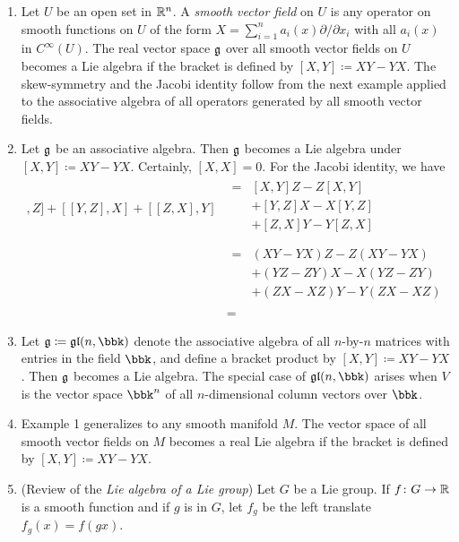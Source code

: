 \begin{examples}
  \begin{enumerate}[label=(\arabic*)]
  \item Let $U$ be an open set in $\mathbb{R}^n$. A \emph{smooth vector field} on
    $U$ is any operator on smooth functions on $U$ of the form
    $X=\sum_{i=1}^na_i(x)\partial/\partial x_i$ with all $a_i(x)$ in
    $C^\infty(U)$. The real vector space $\mathfrak{g}$ over all smooth vector
    fields on $U$ becomes a Lie algebra if the bracket is defined by
    $[X,Y]\coloneq XY-YX$. The skew-symmetry and the Jacobi identity follow
    from the next example applied to the associative algebra of all
    operators generated by all smooth vector fields.
  \item Let $\mathfrak{g}$ be an associative algebra. Then $\mathfrak{g}$ becomes a Lie
    algebra under $[X,Y]\coloneq XY-YX$. Certainly, $[X,X]=0$. For the
    Jacobi identity, we have
    \begin{align*}
      [[X,Y],Z]+[[Y,Z],X]+[[Z,X],Y]
      &\begin{aligned}
        =&[X,Y]Z-Z[X,Y]\\
        &+[Y,Z]X-X[Y,Z]\\
        &+[Z,X]Y-Y[Z,X]\\
      \end{aligned}\\
      &\begin{aligned}
        =&(XY-YX)Z-Z(XY-YX)\\
        &+(YZ-ZY)X-X(YZ-ZY)\\
        &+(ZX-XZ)Y-Y(ZX-XZ)\\
      \end{aligned}\\
      &=
    \end{align*}
  \item Let $\frakg\coloneq\frakgl(n,\bbk)$ denote the associative algebra
    of all $n$-by-$n$ matrices with entries in the field $\bbk$, and define
    a bracket product by $[X,Y]\coloneq XY-YX$. Then $\mathfrak{g}$ becomes a Lie
    algebra. The special case of $\frakgl(n,\bbk)$ arises when $V$ is the
    vector space $\bbk^n$ of all $n$-dimensional column vectors over
    $\bbk$.
  \item Example 1 generalizes to any smooth manifold $M$. The vector space
    of all smooth vector fields on $M$ becomes a real Lie algebra if the
    bracket is defined by $[X,Y]\coloneq XY-YX$.
  \item (Review of the \emph{Lie algebra of a Lie group}) Let $G$ be a Lie
    group. If $f\colon G\to\mathbb{R}$ is a smooth function and if $g$ is in $G$,
    let $f_g$ be the left translate $f_g(x)=f(gx)$.
  \end{enumerate}
\end{examples}

